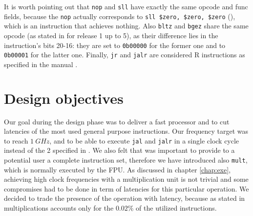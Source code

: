 It is worth pointing out that \verb|nop| and \verb|sll| have exactly the same opcode and func fields,
because the \verb|nop| actually corresponds to \verb|sll $zero, $zero, $zero| (\cite{MIPS64_arch}), which is an instruction that achieves nothing.
Also \verb|bltz| and \verb|bgez| share the same opcode (as stated in \cite{MIPS64_arch} for release 1 up to 5), as their difference lies in the
instruction's bits 20-16: they are set to \verb|0b00000| for the former one and to \verb|0b00001| for the latter one.
Finally, \verb|jr| and \verb|jalr| are considered R instructions as specified in the manual \cite{MIPS64_arch}.

\section{Design objectives}

Our goal during the design phase was to deliver a fast processor and to cut latencies of the most used general purpose instructions. Our frequency target
was to reach $1\ GHz$, and to be able to execute \verb|jal| and \verb|jalr| in a single clock cycle instead of the 2 specified in
\cite{MIPS64_arch}. We also felt that was important to provide to a potential user a complete instruction set, therefore we have introduced also \verb|mult|,
which is normally executed by the FPU. As discussed in chapter \ref{chap:exe}, achieving high clock frequencies with a multiplication unit is not trivial and
some compromises had to be done in term of latencies for this particular operation. We decided to trade the presence of the operation with latency, because as
stated in \cite{code_stats} multiplications accounts only for the $0.02\%$ of the utilized instructions.
